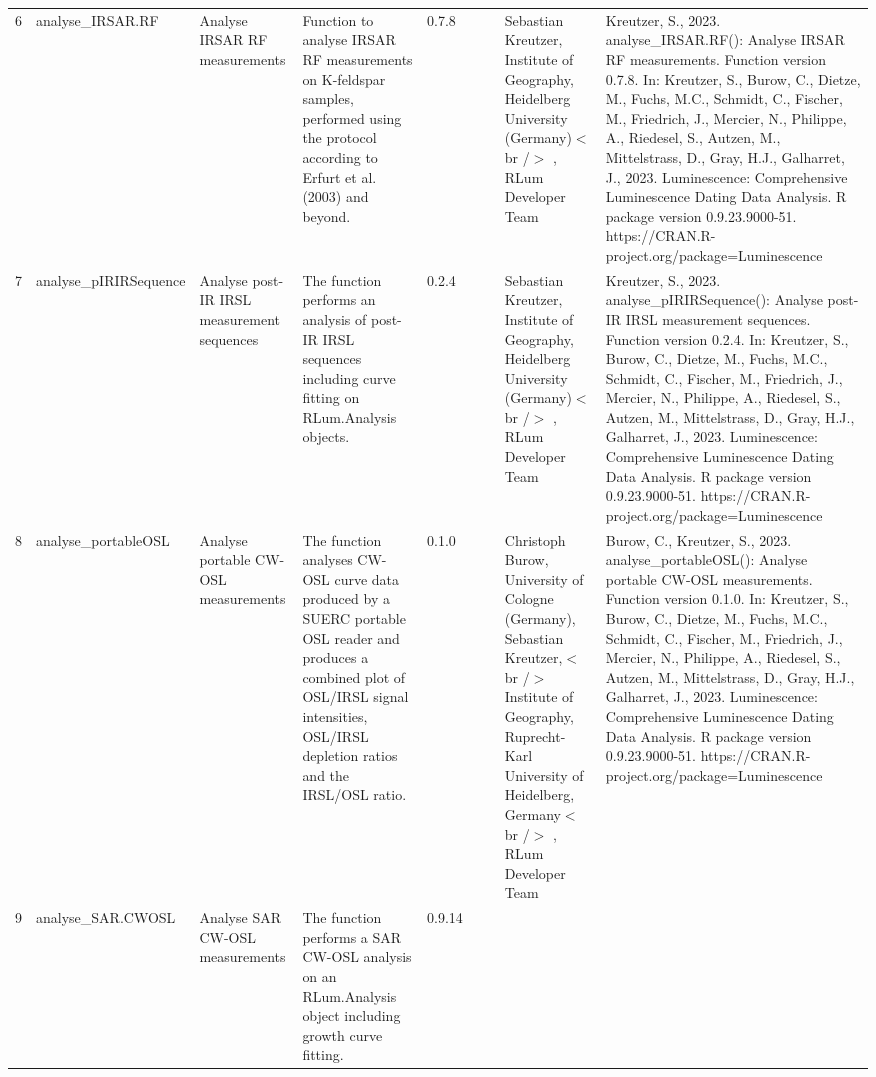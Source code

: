 \begin{table}[ht]
\begin{tabular}{rllllllll}
  6 & analyse\_IRSAR.RF & Analyse IRSAR RF measurements & Function to analyse IRSAR RF measurements on K-feldspar samples, performed using the protocol according to Erfurt et al. (2003) and beyond. & 0.7.8
 &  &  & Sebastian Kreutzer, Institute of Geography, Heidelberg University (Germany)$<$br /$>$ , RLum Developer Team & Kreutzer, S., 2023. analyse\_IRSAR.RF(): Analyse IRSAR RF measurements. Function version 0.7.8. In: Kreutzer, S., Burow, C., Dietze, M., Fuchs, M.C., Schmidt, C., Fischer, M., Friedrich, J., Mercier, N., Philippe, A., Riedesel, S., Autzen, M., Mittelstrass, D., Gray, H.J., Galharret, J., 2023. Luminescence: Comprehensive Luminescence Dating Data Analysis. R package version 0.9.23.9000-51. https://CRAN.R-project.org/package=Luminescence
 \\ 
  7 & analyse\_pIRIRSequence & Analyse post-IR IRSL measurement sequences & The function performs an analysis of post-IR IRSL sequences including curve fitting on  RLum.Analysis  objects. & 0.2.4
 &  &  & Sebastian Kreutzer, Institute of Geography, Heidelberg University (Germany)$<$br /$>$ , RLum Developer Team & Kreutzer, S., 2023. analyse\_pIRIRSequence(): Analyse post-IR IRSL measurement sequences. Function version 0.2.4. In: Kreutzer, S., Burow, C., Dietze, M., Fuchs, M.C., Schmidt, C., Fischer, M., Friedrich, J., Mercier, N., Philippe, A., Riedesel, S., Autzen, M., Mittelstrass, D., Gray, H.J., Galharret, J., 2023. Luminescence: Comprehensive Luminescence Dating Data Analysis. R package version 0.9.23.9000-51. https://CRAN.R-project.org/package=Luminescence
 \\ 
  8 & analyse\_portableOSL & Analyse portable CW-OSL measurements & The function analyses CW-OSL curve data produced by a SUERC portable OSL reader and produces a combined plot of OSL/IRSL signal intensities, OSL/IRSL depletion ratios and the IRSL/OSL ratio. & 0.1.0
 &  &  & Christoph Burow, University of Cologne (Germany), Sebastian Kreutzer,$<$br /$>$ Institute of Geography, Ruprecht-Karl University of Heidelberg, Germany$<$br /$>$ , RLum Developer Team & Burow, C., Kreutzer, S., 2023. analyse\_portableOSL(): Analyse portable CW-OSL measurements. Function version 0.1.0. In: Kreutzer, S., Burow, C., Dietze, M., Fuchs, M.C., Schmidt, C., Fischer, M., Friedrich, J., Mercier, N., Philippe, A., Riedesel, S., Autzen, M., Mittelstrass, D., Gray, H.J., Galharret, J., 2023. Luminescence: Comprehensive Luminescence Dating Data Analysis. R package version 0.9.23.9000-51. https://CRAN.R-project.org/package=Luminescence
 \\ 
  9 & analyse\_SAR.CWOSL & Analyse SAR CW-OSL measurements & The function performs a SAR CW-OSL analysis on an RLum.Analysis  object including growth curve fitting. & 0.9.14

\end{tabular}
\end{table}
